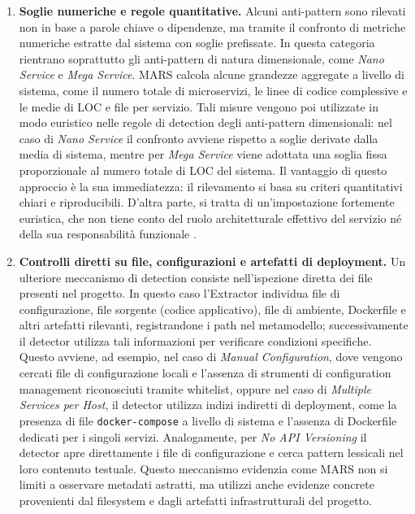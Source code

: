 \begin{enumerate}
    \item \textbf{Soglie numeriche e regole quantitative.}  
    Alcuni anti-pattern sono rilevati non in base a parole chiave o dipendenze,
    ma tramite il confronto di metriche numeriche estratte dal sistema con soglie
    prefissate. In questa categoria rientrano soprattutto gli anti-pattern di
    natura dimensionale, come \textit{Nano Service} e \textit{Mega Service}.
    MARS calcola alcune grandezze aggregate a livello di sistema, come il numero
    totale di microservizi, le linee di codice complessive e le medie di LOC e file
    per servizio. Tali misure vengono poi utilizzate in modo euristico nelle regole
    di detection degli anti-pattern dimensionali: nel caso di \textit{Nano Service}
    il confronto avviene rispetto a soglie derivate dalla media di sistema, mentre
    per \textit{Mega Service} viene adottata una soglia fissa proporzionale al numero
    totale di LOC del sistema. Il vantaggio di questo approccio è la sua
    immediatezza: il rilevamento si basa su criteri quantitativi chiari e
    riproducibili. D'altra parte, si tratta di un'impostazione fortemente
    euristica, che non tiene conto del ruolo architetturale effettivo del servizio
    né della sua responsabilità funzionale \cite{madern2024_mars, MARS}.

    \item \textbf{Controlli diretti su file, configurazioni e artefatti di deployment.}  
    Un ulteriore meccanismo di detection consiste nell'ispezione diretta dei file
    presenti nel progetto. In questo caso l'Extractor individua file di
    configurazione, file sorgente (codice applicativo), file di ambiente, Dockerfile e altri artefatti
    rilevanti, registrandone i path nel metamodello; successivamente il detector
    utilizza tali informazioni per verificare condizioni specifiche. Questo avviene,
    ad esempio, nel caso di \textit{Manual Configuration}, dove vengono cercati
    file di configurazione locali e l'assenza di strumenti di configuration management riconosciuti tramite whitelist, oppure nel caso di \textit{Multiple Services per Host}, il detector utilizza indizi indiretti di deployment, come la presenza di file \texttt{docker-compose} a livello di sistema e l'assenza di Dockerfile dedicati per i singoli servizi.
    Analogamente, per \textit{No API Versioning} il detector apre direttamente i
    file di configurazione e cerca pattern lessicali nel loro contenuto testuale.
    Questo meccanismo evidenzia come MARS non si limiti a osservare metadati
    astratti, ma utilizzi anche evidenze concrete provenienti dal filesystem e
    dagli artefatti infrastrutturali del progetto. 
\end{enumerate}

